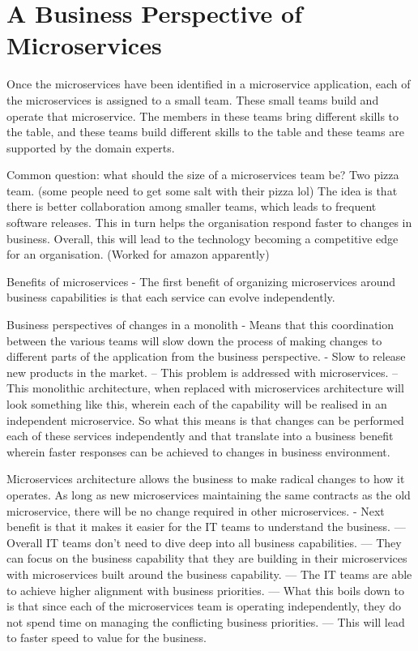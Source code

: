 \documentclass[a4paper, 11pt]{book}
\begin{document}
    \section{A Business Perspective of Microservices}

    Once the microservices have been identified in a microservice application, each of the microservices is assigned to a small team.
    These small teams build and operate that microservice.
    The members in these teams bring different skills to the table, and these teams build different skills to the table and these teams are supported by the domain experts.

    Common question: what should the size of a microservices team be? Two pizza team. (some people need to get some salt with their pizza lol)
    The idea is that there is better collaboration among smaller teams, which leads to frequent software releases.
    This in turn helps the organisation respond faster to changes in business.
    Overall, this will lead to the technology becoming a competitive edge for an organisation. (Worked for amazon apparently)

    Benefits of microservices
    - The first benefit of organizing microservices around business capabilities is that each service can evolve independently.

    Business perspectives of changes in a monolith
    - Means that this coordination between the various teams will slow down the process of making changes to different parts of the application from the business perspective.
    - Slow to release new products in the market.
    -- This problem is addressed with microservices.
    -- This monolithic architecture, when replaced with microservices architecture will look something like this, wherein each of the capability will be realised in an independent microservice.
    So what this means is that changes can be performed each of these services independently and that translate into a business benefit wherein faster responses can be achieved to changes in business environment.

    Microservices architecture allows the business to make radical changes to how it operates.
    As long as new microservices maintaining the same contracts as the old microservice, there will be no change required in other microservices.
    - Next benefit is that it makes it easier for the IT teams to understand the business.
    --- Overall IT teams don't need to dive deep into all business capabilities.
    --- They can focus on the business capability that they are building in their microservices with microservices built around the business capability.
    --- The IT teams are able to achieve higher alignment with business priorities.
    --- What this boils down to is that since each of the microservices team is operating independently, they do not spend time on managing the conflicting business priorities.
    --- This will lead to faster speed to value for the business.
\end{document}
